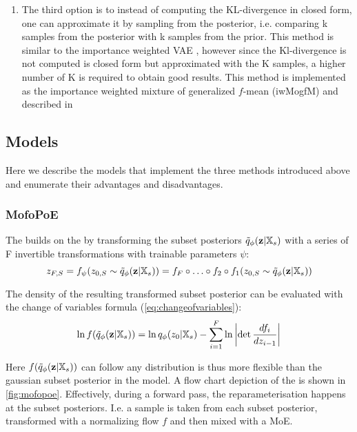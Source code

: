 \begin{enumerate}
    \item The third option is to instead of computing the KL-divergence in closed form, one can approximate it by sampling from the posterior, i.e. comparing k samples from the posterior with k samples from the prior.
    This method is similar to the importance weighted VAE \parencite[iwVAE]{burda_importance_2016}, however since the Kl-divergence is not computed is closed form but approximated with the K samples, a higher number of K is required to obtain good results.
    This method is implemented as the importance weighted mixture of generalized $f$-mean (iwMogfM) and described in %
\end{enumerate}

\subsection{Models}
Here we describe the models that implement the three methods introduced above and enumerate their advantages and disadvantages.

\subsubsection{MofoPoE}\label{subsec:mofopoe}
The  builds on the  by transforming the subset posteriors $\tilde{q}_{\phi}(\textbf{z}|\mathbb{X}_s)$ with a series of F invertible transformations with trainable parameters $\psi$:
\begin{equation}
    z_{F,S} =f_{\psi}(z_{0,S} \sim \tilde{q}_{\phi}(\textbf{z}|\mathbb{X}_s)) = f_F \circ \ldots \circ f_2 \circ f_1(z_{0,S} \sim \tilde{q}_{\phi}(\textbf{z}|\mathbb{X}_s))
\end{equation}

The density of the resulting transformed subset posterior can be evaluated with the change of variables formula (\cref{eq:changeofvariables}):
\begin{equation}
    \label{eq:changeofvariables_}
    \ln f(\tilde{q}_{\phi}(\textbf{z}|\mathbb{X}_s)) = \ln q_\phi (z_0|\mathbb{X}_s) - \sum _{i=1} ^{F}\ln \left|  \det \frac{df_i}{dz_{i-1}}\right|
\end{equation}

Here $f(\tilde{q}_{\phi}(\textbf{z}|\mathbb{X}_s))$ can follow any distribution is thus more flexible than the gaussian subset posterior in the  model.
A flow chart depiction of the  is shown in \cref{fig:mofopoe}.
Effectively, during a forward pass, the reparameterisation happens at the subset posteriors.
I.e. a sample is taken from each subset posterior, transformed with a normalizing flow $f$ and then mixed with a MoE.

